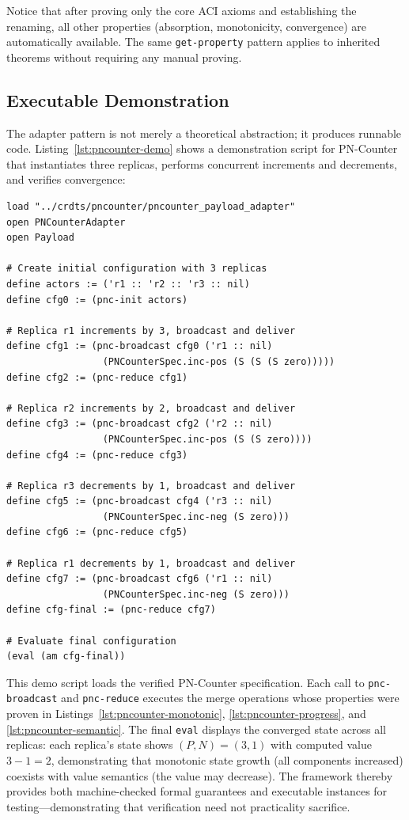 Notice that after proving only the core ACI axioms and establishing the renaming, all other properties (absorption, monotonicity, convergence) are automatically available. The same \texttt{get-property} pattern applies to inherited theorems without requiring any manual proving.

\subsection{Executable Demonstration}

The adapter pattern is not merely a theoretical abstraction; it produces runnable code. Listing~\ref{lst:pncounter-demo} shows a demonstration script for PN-Counter that instantiates three replicas, performs concurrent increments and decrements, and verifies convergence:

\begin{lstlisting}[language=Athena,style=athena,label={lst:pncounter-demo},caption={PN-Counter executable demo: concurrent operations and convergence}]
load "../crdts/pncounter/pncounter_payload_adapter"
open PNCounterAdapter
open Payload

# Create initial configuration with 3 replicas
define actors := ('r1 :: 'r2 :: 'r3 :: nil)
define cfg0 := (pnc-init actors)

# Replica r1 increments by 3, broadcast and deliver
define cfg1 := (pnc-broadcast cfg0 ('r1 :: nil) 
                 (PNCounterSpec.inc-pos (S (S (S zero)))))
define cfg2 := (pnc-reduce cfg1)

# Replica r2 increments by 2, broadcast and deliver
define cfg3 := (pnc-broadcast cfg2 ('r2 :: nil) 
                 (PNCounterSpec.inc-pos (S (S zero))))
define cfg4 := (pnc-reduce cfg3)

# Replica r3 decrements by 1, broadcast and deliver
define cfg5 := (pnc-broadcast cfg4 ('r3 :: nil) 
                 (PNCounterSpec.inc-neg (S zero)))
define cfg6 := (pnc-reduce cfg5)

# Replica r1 decrements by 1, broadcast and deliver
define cfg7 := (pnc-broadcast cfg6 ('r1 :: nil) 
                 (PNCounterSpec.inc-neg (S zero)))
define cfg-final := (pnc-reduce cfg7)

# Evaluate final configuration
(eval (am cfg-final))
\end{lstlisting}

This demo script loads the verified PN-Counter specification. Each call to \texttt{pnc-broadcast} and \texttt{pnc-reduce} executes the merge operations whose properties were proven in Listings~\ref{lst:pncounter-monotonic}, \ref{lst:pncounter-progress}, and \ref{lst:pncounter-semantic}. The final \texttt{eval} displays the converged state across all replicas: each replica's state shows $(P, N) = (3, 1)$ with computed value $3 - 1 = 2$, demonstrating that monotonic state growth (all components increased) coexists with value semantics (the value may decrease). The framework thereby provides both machine-checked formal guarantees and executable instances for testing---demonstrating that verification need not practicality sacrifice.

